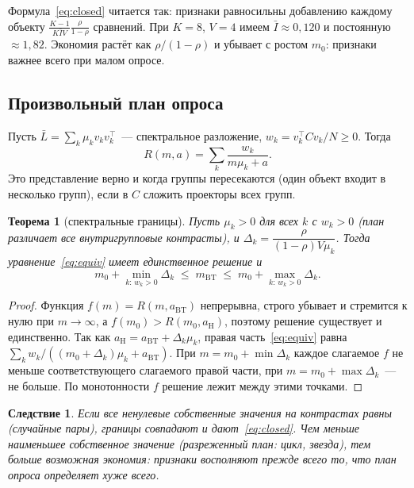 \documentclass{article}
\newtheorem{theorem}{Теорема}
\newtheorem{corollary}{Следствие}
\theoremstyle{definition}
\theoremstyle{remark}
\newcommand{\Lbar}{\bar{L}}
\newcommand{\Ibar}{\bar{I}}
\newcommand{\aBT}{a_{\mathrm{BT}}}
\newcommand{\aH}{a_{\mathrm{H}}}
\newcommand{\mBT}{m_{\mathrm{BT}}}
\begin{document}
Формула~\eqref{eq:closed} читается так: признаки равносильны добавлению каждому объекту $\frac{K-1}{K\Ibar V}\frac{\rho}{1-\rho}$ сравнений. При $K=8$, $V=4$ имеем $\Ibar\approx0{,}120$ и постоянную $\approx1{,}82$. Экономия растёт как $\rho/(1-\rho)$ и убывает с ростом $m_0$: признаки важнее всего при малом опросе.

\subsection{Произвольный план опроса}

Пусть $\Lbar=\sum_k\mu_k v_kv_k^{\top}$~--- спектральное разложение, $w_k=v_k^{\top}Cv_k/N\ge0$. Тогда
\begin{equation}\label{eq:spectral}
R(m,a)=\sum_k\frac{w_k}{m\mu_k+a}.
\end{equation}
Это представление верно и когда группы пересекаются (один объект входит в несколько групп), если в $C$ сложить проекторы всех групп.

\begin{theorem}[спектральные границы]\label{thm:bounds}
Пусть $\mu_k>0$ для всех $k$ с $w_k>0$ (план различает все внутригрупповые контрасты), и $\Delta_k=\dfrac{\rho}{(1-\rho)V\mu_k}$. Тогда уравнение~\eqref{eq:equiv} имеет единственное решение и
\begin{equation}\label{eq:bounds}
m_0+\min_{k:\,w_k>0}\Delta_k\;\le\;\mBT\;\le\;m_0+\max_{k:\,w_k>0}\Delta_k .
\end{equation}
\end{theorem}
\begin{proof}
Функция $f(m)=R(m,\aBT)$ непрерывна, строго убывает и стремится к нулю при $m\to\infty$, а $f(m_0)>R(m_0,\aH)$, поэтому решение существует и единственно. Так как $\aH=\aBT+\Delta_k\mu_k$, правая часть~\eqref{eq:equiv} равна $\sum_k w_k/((m_0+\Delta_k)\mu_k+\aBT)$. При $m=m_0+\min\Delta_k$ каждое слагаемое $f$ не меньше соответствующего слагаемого правой части, при $m=m_0+\max\Delta_k$~--- не больше. По монотонности $f$ решение лежит между этими точками.
\end{proof}

\begin{corollary}
Если все ненулевые собственные значения на контрастах равны (случайные пары), границы совпадают и дают~\eqref{eq:closed}. Чем меньше наименьшее собственное значение (разреженный план: цикл, звезда), тем больше возможная экономия: признаки восполняют прежде всего то, что план опроса определяет хуже всего.
\end{corollary}
\end{document}
